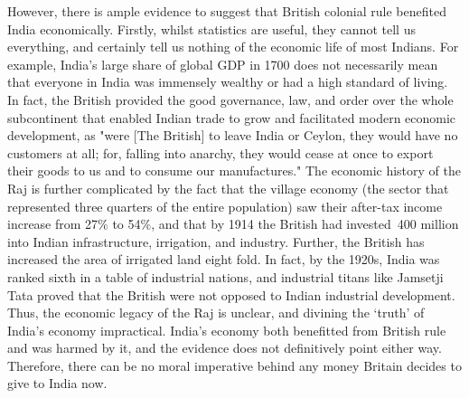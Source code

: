    However, there is ample evidence to suggest that British colonial rule
   benefited India economically. Firstly, whilst statistics are useful,
   they cannot tell us everything, and certainly tell us nothing of the
   economic life of most Indians. For example, India's large share of
   global GDP in 1700 does not necessarily mean that everyone in India was
   immensely wealthy or had a high standard of living. In fact, the
   British provided the good governance, law, and order over the whole
   subcontinent that enabled Indian trade to grow and facilitated modern
   economic development, as "were [The British] to leave India or Ceylon,
   they would have no customers at all; for, falling into anarchy, they
   would cease at once to export their goods to us and to consume our
   manufactures." The economic history of the Raj is further complicated
   by the fact that the village economy (the sector that represented three
   quarters of the entire population) saw their after-tax income increase
   from 27\% to 54\%, and that by 1914 the British had invested \textsterling\,400 million
   into Indian infrastructure, irrigation, and industry. Further, the
   British has increased the area of irrigated land eight fold. In fact,
   by the 1920s, India was ranked sixth in a table of industrial nations,
   and industrial titans like Jamsetji Tata proved that the British were
   not opposed to Indian industrial development. Thus, the economic legacy
   of the Raj is unclear, and divining the `truth' of India's economy
   impractical. India's economy both benefitted from British rule and was
   harmed by it, and the evidence does not definitively point either way.
   Therefore, there can be no moral imperative behind any money Britain
   decides to give to India now.

